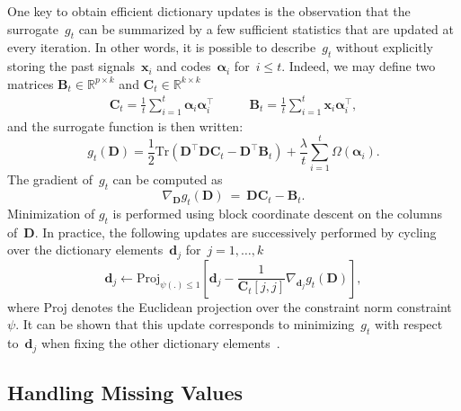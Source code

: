 \documentclass{article}
\def\RR{{\mathbb{R}}}
\def\x{{\mathbf x}}
\def\B{{\mathbf B}}
\def\C{{\mathbf C}}
\def\D{{\mathbf D}}
\def\d{{\mathbf d}}
\def\x{{\mathbf x}}
\newcommand{\transpose}{^\top}
\newcommand{\balpha}{\boldsymbol{\alpha}}
\begin{document}
One key to obtain efficient dictionary updates is the observation that
the surrogate~$g_t$ can be summarized by a few sufficient statistics that
are updated at every iteration. In other words, it is possible to
describe~$g_t$ without explicitly storing the past signals~$\x_i$ and
codes~$\balpha_i$ for~$i \leq t$.
Indeed, we may define two matrices $\B_t \in \RR^{p \times
k}$ and $\C_t \in \RR^{k \times k}$
\begin{align}
    \label{eq:original_statistics}
    \C_t = \frac{1}{t} \sum_{i = 1}^t \balpha_i \balpha_i\transpose
    &\qquad \B_t = \frac{1}{t} \sum_{i = 1}^t \x_i \balpha_i\transpose,
\end{align}
and the
surrogate function is then written:
\begin{equation}
    \label{eq:original_surrogate_2}
    g_t (\D) =  \frac{1}{2} \mathrm{Tr} (\D\transpose\D \C_t - \D\transpose \B_t) + \frac{\lambda}{t} \sum_{i = 1}^t \Omega(\balpha_i).
\end{equation}
The gradient of~$g_t$ can be computed as
\begin{equation}
	\nabla_\D g_t(\D)~=~\D \C_t - \B_t.
\end{equation}
Minimization of $g_t$ is performed using block coordinate descent on the columns of~$\D$. In practice,
the following updates are successively performed by cycling over the dictionary elements~$\d_j$ for~$j=1,\ldots,k$
\begin{equation}
   \d_j  \leftarrow   \text{Proj}_{\psi(.) \leq 1} \left[ \d_j - \frac{1}{\C_t[j,j]} \nabla_{\d_j}g_t(\D)\right],\label{eq:proj}
\end{equation}
where $\text{Proj}$ denotes the Euclidean projection over the constraint norm
constraint~$\psi$.  It can be shown that this update corresponds to
minimizing~$g_t$ with respect to~$\d_j$ when fixing the other dictionary
elements~\citep[see][]{mairal_online_2010}.


\subsection{Handling Missing Values} \label{subsec:masked}
\end{document}
